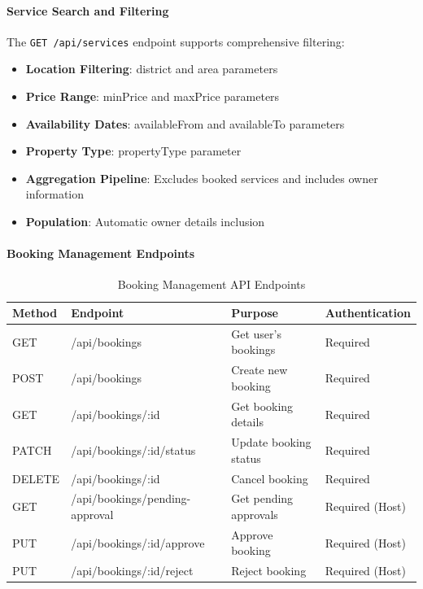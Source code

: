 \documentclass[12pt,a4paper]{article}
\newcommand{\code}[1]{\texttt{#1}}
\begin{document}
\paragraph{Service Search and Filtering}
The \code{GET /api/services} endpoint supports comprehensive filtering:
\begin{itemize}
\item \textbf{Location Filtering}: district and area parameters
\item \textbf{Price Range}: minPrice and maxPrice parameters
\item \textbf{Availability Dates}: availableFrom and availableTo parameters
\item \textbf{Property Type}: propertyType parameter
\item \textbf{Aggregation Pipeline}: Excludes booked services and includes owner information
\item \textbf{Population}: Automatic owner details inclusion
\end{itemize}

\paragraph{Booking Management Endpoints}
\begin{table}[H]
\centering
\small
\begin{tabular}{@{}llll@{}}
\toprule
\textbf{Method} & \textbf{Endpoint} & \textbf{Purpose} & \textbf{Authentication} \\
\midrule
GET & /api/bookings & Get user's bookings & Required \\
POST & /api/bookings & Create new booking & Required \\
GET & /api/bookings/:id & Get booking details & Required \\
PATCH & /api/bookings/:id/status & Update booking status & Required \\
DELETE & /api/bookings/:id & Cancel booking & Required \\
GET & /api/bookings/pending-approval & Get pending approvals & Required (Host) \\
PUT & /api/bookings/:id/approve & Approve booking & Required (Host) \\
PUT & /api/bookings/:id/reject & Reject booking & Required (Host) \\
\bottomrule
\end{tabular}
\caption{Booking Management API Endpoints}
\label{tab:booking-endpoints}
\end{table}
\end{document}
